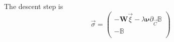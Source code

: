 \documentclass[aps,12pt]{revtex4}
\begin{document}
The descent step is
\begin{equation}
	\vec{\sigma} = 
	\begin{pmatrix}
	-\bm{W} \vec{\xi} - \lambda \bm{\nu} \partial_{\vec{C}} \mathbb{B} \\
	-\mathbb{B}\\
	\end{pmatrix}
\end{equation}
\end{document}
